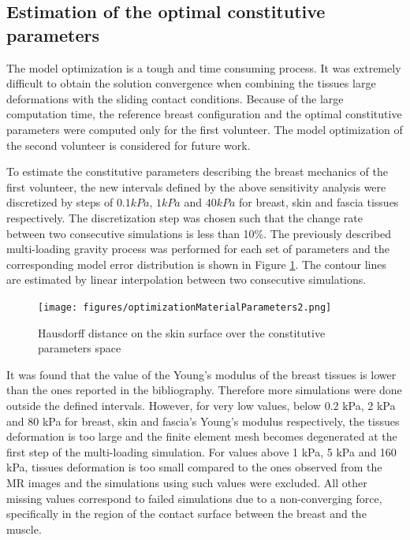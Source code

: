 \subsection{Estimation of the optimal constitutive parameters}

The model optimization is a tough and time consuming process. It was extremely difficult to obtain the solution convergence when combining the tissues large deformations with the sliding contact conditions. Because of the large computation time, the reference breast configuration and the optimal constitutive parameters were computed only for the first volunteer. The model optimization of the second volunteer is considered for future work.

To estimate the constitutive parameters describing the breast mechanics of the first volunteer, the new intervals defined by the above sensitivity analysis were discretized by steps of $0.1 kPa$, $1kPa$ and $40 kPa$ for breast, skin and fascia tissues respectively. The discretization step was chosen such that the change rate between two consecutive simulations is less than 10\%. The previously described multi-loading gravity process was performed for each set of parameters and the corresponding model error distribution is shown in  Figure \ref{fig:optimizationresults}. The contour lines are estimated by linear interpolation between two consecutive simulations.

\begin{figure}[!h]
\centering
\texttt{[image: figures/optimizationMaterialParameters2.png]} 
\caption{Hausdorff distance on the skin surface over the constitutive parameters space}\label{fig:optimizationresults}
\end{figure}

It was found that the value of the Young's modulus of the breast tissues is lower than the ones reported in the bibliography. Therefore more simulations were done outside the defined intervals. However, for very low values, below 0.2 kPa, 2 kPa and 80 kPa for breast, skin and fascia's Young's modulus respectively, the tissues deformation is too large and the finite element mesh becomes degenerated at the first step of the multi-loading simulation. For values above 1 kPa, 5 kPa and 160 kPa, tissues deformation is too small compared to the ones observed from the MR images and the simulations using such values were excluded. All other missing values correspond to failed simulations due to a non-converging force, specifically in the region of the contact surface between the breast and the muscle.


